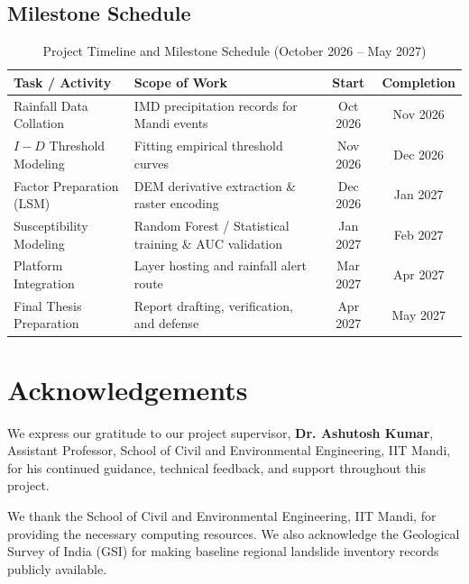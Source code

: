 \documentclass[12pt,a4paper]{report}
\begin{document}
\section{Milestone Schedule}

\begin{table}[h!]
\centering
\caption{Project Timeline and Milestone Schedule (October 2026 -- May 2027)}
\label{tab:timeline}
\vspace{0.2cm}
\begin{tabularx}{\textwidth}{p{3.5cm}Xcc}
\toprule
\textbf{Task / Activity} & \textbf{Scope of Work} & \textbf{Start} & \textbf{Completion} \\
\midrule
Rainfall Data Collation & IMD precipitation records for Mandi events & Oct 2026 & Nov 2026 \\
$I-D$ Threshold Modeling & Fitting empirical threshold curves & Nov 2026 & Dec 2026 \\
Factor Preparation (LSM) & DEM derivative extraction \& raster encoding & Dec 2026 & Jan 2027 \\
Susceptibility Modeling & Random Forest / Statistical training \& AUC validation & Jan 2027 & Feb 2027 \\
Platform Integration & Layer hosting and rainfall alert route & Mar 2027 & Apr 2027 \\
Final Thesis Preparation & Report drafting, verification, and defense & Apr 2027 & May 2027 \\
\bottomrule
\end{tabularx}
\end{table}

\newpage

\chapter*{Acknowledgements}

We express our gratitude to our project supervisor, \textbf{Dr. Ashutosh Kumar}, Assistant Professor, School of Civil and Environmental Engineering, IIT Mandi, for his continued guidance, technical feedback, and support throughout this project. 

We thank the School of Civil and Environmental Engineering, IIT Mandi, for providing the necessary computing resources. We also acknowledge the Geological Survey of India (GSI) for making baseline regional landslide inventory records publicly available.
\end{document}
